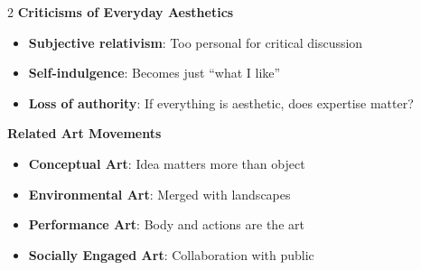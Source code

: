 \documentclass[11pt,letterpaper]{article}
\newcommand{\mysubsection}[1]{%
    \vspace{-0.2em}
    {\bfseries\color{sectioncolor}#1}%
    \vspace{0.1em}
}
\begin{document}
\begin{multicols*}{2}
\mysubsection{Criticisms of Everyday Aesthetics}
\begin{itemize}[leftmargin=*, noitemsep, topsep=0pt]
    \item \textbf{Subjective relativism}: Too personal for critical discussion
    \item \textbf{Self-indulgence}: Becomes just ``what I like''
    \item \textbf{Loss of authority}: If everything is aesthetic, does expertise matter?
\end{itemize}

\mysubsection{Related Art Movements}
\begin{itemize}[leftmargin=*, noitemsep, topsep=0pt]
    \item \textbf{Conceptual Art}: Idea matters more than object
    \item \textbf{Environmental Art}: Merged with landscapes
    \item \textbf{Performance Art}: Body and actions are the art
    \item \textbf{Socially Engaged Art}: Collaboration with public
\end{itemize}

\end{multicols*}
\end{document}
